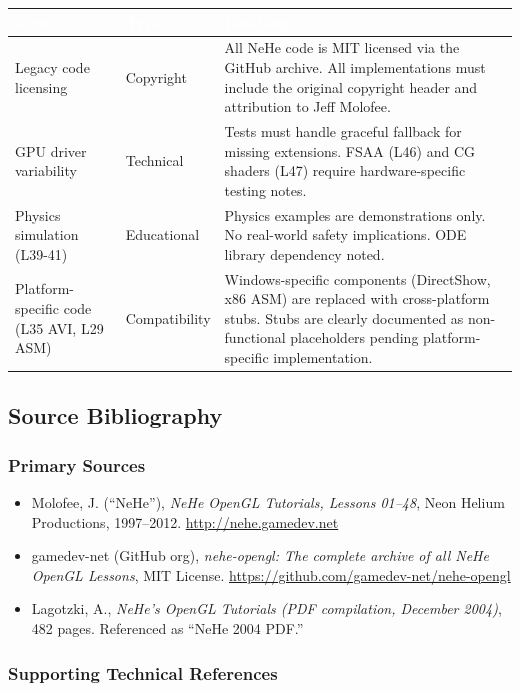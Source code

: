 \documentclass[11pt,letterpaper]{article}
\newcommand{\tableheader}[1]{\textbf{\sffamily\textcolor{white}{#1}}}
\begin{document}
\begin{center}
\begin{tabularx}{\textwidth}{L{3.5cm}L{2cm}X}
\toprule
{}
\tableheader{Area} & \tableheader{Type} & \tableheader{Handling} \\
\midrule
Legacy code licensing & Copyright & All NeHe code is MIT licensed via the GitHub archive. All implementations must include the original copyright header and attribution to Jeff Molofee. \\
GPU driver variability & Technical & Tests must handle graceful fallback for missing extensions. FSAA (L46) and CG shaders (L47) require hardware-specific testing notes. \\
Physics simulation (L39-41) & Educational & Physics examples are demonstrations only. No real-world safety implications. ODE library dependency noted. \\
Platform-specific code (L35 AVI, L29 ASM) & Compatibility & Windows-specific components (DirectShow, x86 ASM) are replaced with cross-platform stubs. Stubs are clearly documented as non-functional placeholders pending platform-specific implementation. \\
\bottomrule
\end{tabularx}
\end{center}

\subsection{Source Bibliography}

\subsubsection{Primary Sources}

\begin{itemize}
\item Molofee, J. (``NeHe''), \textit{NeHe OpenGL Tutorials, Lessons 01--48}, Neon Helium Productions, 1997--2012. \url{http://nehe.gamedev.net}
\item gamedev-net (GitHub org), \textit{nehe-opengl: The complete archive of all NeHe OpenGL Lessons}, MIT License. \url{https://github.com/gamedev-net/nehe-opengl}
\item Lagotzki, A., \textit{NeHe's OpenGL Tutorials (PDF compilation, December 2004)}, 482 pages. Referenced as ``NeHe 2004 PDF.''
\end{itemize}

\subsubsection{Supporting Technical References}
\end{document}
